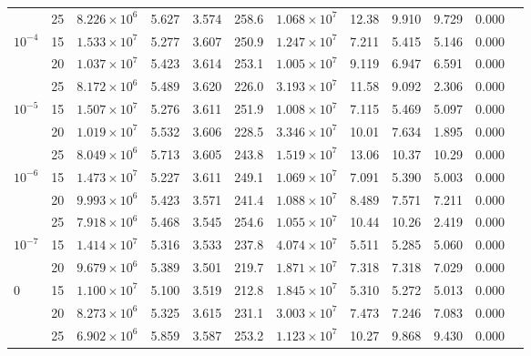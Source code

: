 {\begin{table}[h!]
{\begin{tabular}{lccccccccccc}
                    & 25 & $8.226 \times 10^6$  & 5.627 & 3.574 & 258.6 & $1.068 \times 10^7$ & 12.38  & 9.910  & 9.729  & 0.000  \\
        $10^{-4}$   & 15 & $1.533 \times 10^7$  & 5.277 & 3.607 & 250.9 & $1.247 \times 10^7$ & 7.211  & 5.415  & 5.146  & 0.000  \\
                    & 20 & $1.037 \times 10^7$  & 5.423 & 3.614 & 253.1 & $1.005 \times 10^7$ & 9.119  & 6.947  & 6.591  & 0.000  \\
                    & 25 & $8.172 \times 10^6$  & 5.489 & 3.620 & 226.0 & $3.193 \times 10^7$ & 11.58  & 9.092  & 2.306  & 0.000  \\
        $10^{-5}$   & 15 & $1.507 \times 10^7$  & 5.276 & 3.611 & 251.9 & $1.008 \times 10^7$ & 7.115  & 5.469  & 5.097  & 0.000  \\
                    & 20 & $1.019 \times 10^7$  & 5.532 & 3.606 & 228.5 & $3.346 \times 10^7$ & 10.01  & 7.634  & 1.895  & 0.000  \\
                    & 25 & $8.049 \times 10^6$  & 5.713 & 3.605 & 243.8 & $1.519 \times 10^7$ & 13.06  & 10.37  & 10.29  & 0.000  \\
        $10^{-6}$   & 15 & $1.473 \times 10^7$  & 5.227 & 3.611 & 249.1 & $1.069 \times 10^7$ & 7.091  & 5.390  & 5.003  & 0.000  \\
                    & 20 & $9.993 \times 10^6$  & 5.423 & 3.571 & 241.4 & $1.088 \times 10^7$ & 8.489  & 7.571  & 7.211  & 0.000  \\
                    & 25 & $7.918 \times 10^6$  & 5.468 & 3.545 & 254.6 & $1.055 \times 10^7$ & 10.44  & 10.26  & 2.419  & 0.000  \\
        $10^{-7}$   & 15 & $1.414 \times 10^7$  & 5.316 & 3.533 & 237.8 & $4.074 \times 10^7$ & 5.511  & 5.285  & 5.060  & 0.000  \\
                    & 20 & $9.679 \times 10^6$  & 5.389 & 3.501 & 219.7 & $1.871 \times 10^7$ & 7.318  & 7.318  & 7.029  & 0.000  \\
        $0$         & 15 & $1.100 \times 10^7$  & 5.100 & 3.519 & 212.8 & $1.845 \times 10^7$ & 5.310  & 5.272  & 5.013  & 0.000  \\
                    & 20 & $8.273 \times 10^6$  & 5.325 & 3.615 & 231.1 & $3.003 \times 10^7$ & 7.473  & 7.246  & 7.083  & 0.000  \\
                    & 25 & $6.902 \times 10^6$  & 5.859 & 3.587 & 253.2 & $1.123 \times 10^7$ & 10.27  & 9.868  & 9.430  & 0.000  \\
	\bottomrule    
        \end{tabular}}
    \label{tab:OIEVMZ}
\end{table}
}


